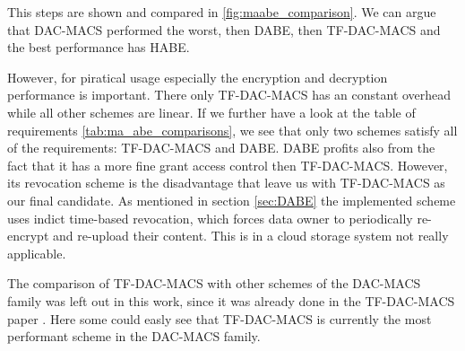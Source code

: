 This steps are shown and compared in \ref{fig:maabe_comparison}. We can argue that \ac{DAC-MACS} performed the worst, then \ac{DABE}, then \ac{TF-DAC-MACS} and the best performance has \ac{HABE}.  

However, for piratical usage especially the encryption and decryption performance is important. There only \ac{TF-DAC-MACS} has an constant overhead while all other schemes are linear. If we further have a look at the table of requirements \ref{tab:ma_abe_comparisons}, we see that only two schemes satisfy all of the requirements: \ac{TF-DAC-MACS} and \ac{DABE}. \ac{DABE} profits also from the fact that it has a more fine grant access control then \ac{TF-DAC-MACS}. However, its revocation scheme is the disadvantage that leave us with \ac{TF-DAC-MACS} as our final candidate. As mentioned in section \ref{sec:DABE} the implemented scheme uses indict time-based revocation, which forces data owner to periodically re-encrypt and re-upload their content. This is in a cloud storage system not really applicable. 

The comparison of \ac{TF-DAC-MACS} with other schemes of the \ac{DAC-MACS} family was left out in this work, since it was already done in the \ac{TF-DAC-MACS} paper \cite{li2017two}. Here some could easly see that \ac{TF-DAC-MACS} is currently the most performant scheme in the \ac{DAC-MACS} family.  